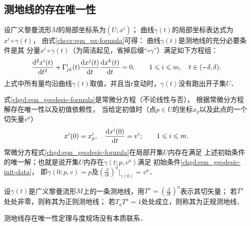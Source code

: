 \subsection{测地线的存在唯一性}
设广义黎曼流形$M$的局部坐标系为$(U;x^i)$；
曲线$\gamma(t)$的局部坐标表达式为$x^i\circ\gamma(t)$，
由式\eqref{chccr:eqn_px-formula}可得：
曲线$\gamma(t)$是测地线的充分必要条件是其
分量$x^i\circ\gamma(t)$（为简洁起见，省掉后缀“$\circ\gamma$”）满足如下方程组：
\begin{equation}\label{chgd:eqn_geodesic-formula}
    \frac{{\rm d}^2 x^i(t)}{{\rm d}t^2} + \Gamma_{jk}^i(t)
    \frac{{\rm d}x^j(t)}{{\rm d} t} \frac{{\rm d}x^k(t)}{{\rm d} t} =0,
    \qquad 1 \leqslant i \leqslant m , \quad t\in (-\delta,\delta).
\end{equation}
上式中所有量均沿曲线$\gamma(t)$取值，并且当$t$变动时，$\gamma(t)$没有跑出开子集$U$．



式\eqref{chgd:eqn_geodesic-formula}是常微分方程（不论线性与否），
根据常微分方程解存在唯一性以及初值依赖性，
当给定初值时（点$p\in U$的坐标$x_p$以及此点的一个切矢量$v^a$）
\begin{equation}\label{chgd:eqn_geodesic-init-data}
    x^i(0) = x^i_p, \quad \frac{{\rm d}x^i(0)}{{\rm d}t}=v^i;
    \qquad 1 \leqslant i \leqslant m.
\end{equation}
常微分方程式\eqref{chgd:eqn_geodesic-formula}在局部开集$U$内存在满足
上述初始条件的唯一解；也就是说开集$U$内存在$\gamma(t;p,v^a)$满足
初始条件\eqref{chgd:eqn_geodesic-init-data}，
即$\gamma(0;p,v)=p$及$(\frac{\partial}{\partial t})^a|_{\gamma(0)}=v^a$．

\begin{definition}
    设$\gamma(t)$是广义黎曼流形$M$上的一条测地线，用$T^a=(\frac{\partial}{\partial t})^a$表示其切矢量；
    若$T^a$处处非零，则称其为{\heiti 正则测地线}；
    若$T_a T^a=1$处处成立，则称其为{\heiti 正规测地线}．
\end{definition}

测地线存在唯一性定理与度规场没有本质联系．

